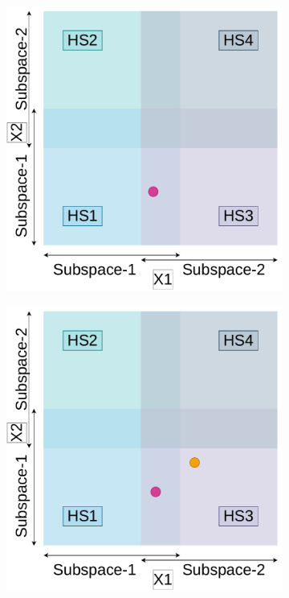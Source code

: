 \begin{figure}[H]
\begin{subfigure}{0.45\textwidth}
		\caption{}
		\label{fig:ovr-dsbo-b}
	\end{subfigure}
	\begin{subfigure}{0.45\textwidth}
		\centering
		\includegraphics[scale=0.3]{figures/ovr-dbo/ovr-dbo-03.pdf}
		\caption{}
		\label{fig:ovr-dsbo-c}
	\end{subfigure}
	\begin{subfigure}{0.45\textwidth}
		\centering
		\includegraphics[scale=0.3]{figures/ovr-dbo/ovr-dbo-04.pdf}

\end{subfigure}
\end{figure}
